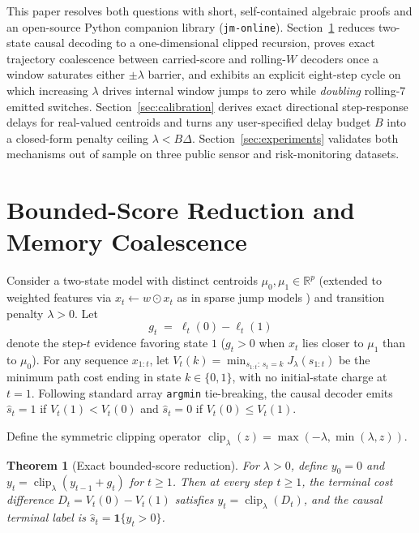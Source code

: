 \documentclass[11pt]{article}
\newtheorem{theorem}{Theorem}
\newcommand{\clip}{\operatorname{clip}}
\newcommand{\ind}{\mathbf{1}}
\begin{document}
This paper resolves both questions with short, self-contained algebraic proofs and an open-source Python companion library (\texttt{jm-online}). Section~\ref{sec:theory} reduces two-state causal decoding to a one-dimensional clipped recursion, proves exact trajectory coalescence between carried-score and rolling-$W$ decoders once a window saturates either $\pm\lambda$ barrier, and exhibits an explicit eight-step cycle on which increasing $\lambda$ drives internal window jumps to zero while \emph{doubling} rolling-$7$ emitted switches. Section~\ref{sec:calibration} derives exact directional step-response delays for real-valued centroids and turns any user-specified delay budget $B$ into a closed-form penalty ceiling $\lambda < B\Delta$. Section~\ref{sec:experiments} validates both mechanisms out of sample on three public sensor and risk-monitoring datasets.

\section{Bounded-Score Reduction and Memory Coalescence}
\label{sec:theory}

Consider a two-state model with distinct centroids $\mu_0, \mu_1 \in \mathbb{R}^p$ (extended to weighted features via $x_t \leftarrow w \odot x_t$ as in sparse jump models \cite{nystrup2021}) and transition penalty $\lambda > 0$. Let
\[
  g_t \;=\; \ell_t(0) - \ell_t(1)
\]
denote the step-$t$ evidence favoring state $1$ ($g_t > 0$ when $x_t$ lies closer to $\mu_1$ than to $\mu_0$). For any sequence $x_{1:t}$, let $V_t(k) = \min_{s_{1:t}:\, s_t = k} J_\lambda(s_{1:t})$ be the minimum path cost ending in state $k \in \{0,1\}$, with no initial-state charge at $t=1$. Following standard array \texttt{argmin} tie-breaking, the causal decoder emits $\hat{s}_t = 1$ if $V_t(1) < V_t(0)$ and $\hat{s}_t = 0$ if $V_t(0) \le V_t(1)$.

Define the symmetric clipping operator $\clip_\lambda(z) = \max(-\lambda, \min(\lambda, z))$.

\begin{theorem}[Exact bounded-score reduction]
\label{thm:reduction}
For $\lambda > 0$, define $y_0 = 0$ and $y_t = \clip_\lambda(y_{t-1} + g_t)$ for $t \ge 1$. Then at every step $t \ge 1$, the terminal cost difference $D_t = V_t(0) - V_t(1)$ satisfies $y_t = \clip_\lambda(D_t)$, and the causal terminal label is $\hat{s}_t = \ind\{y_t > 0\}$.
\end{theorem}
\end{document}
